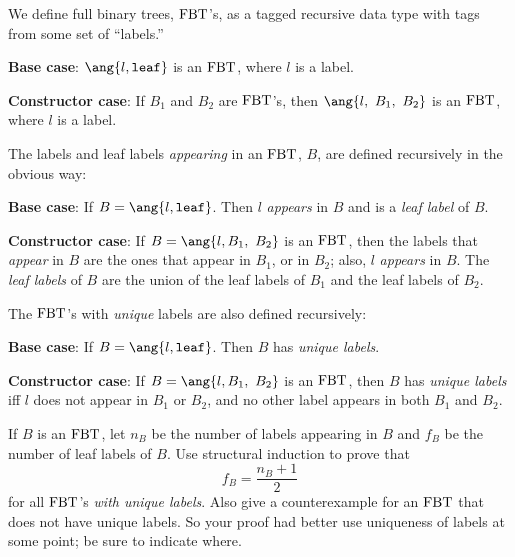 \documentclass[handout]{mcs}
\begin{document}
\begin{problem}

We define full binary trees, $\text{FBT}$'s, as a tagged recursive
data type with tags from some set of ``labels.''
\begin{definition*}

\textbf{Base case}: $\ang{l, \texttt{leaf}}$ is an $\text{FBT}$, where $l$ is a
label.

\textbf{Constructor case}: If $B_1$ and $B_2$ are $\text{FBT}$'s, then
$\ang{l,\ B_1,\ B_2}$ is an $\text{FBT}$, where $l$ is a label.

\end{definition*}

The labels and leaf labels \emph{appearing} in an $\text{FBT}$, $B$, are defined
recursively in the obvious way:

\begin{definition*}

\textbf{Base case}: If $B = \ang{l, \texttt{leaf}}$.  Then $l$
\emph{appears} in $B$ and is a \emph{leaf label} of $B$.

\textbf{Constructor case}: If $B=\ang{l, B_1,\ B_2}$ is an $\text{FBT}$, then
the labels that \emph{appear} in $B$ are the ones that appear in $B_1$, or
in $B_2$; also, $l$ \emph{appears} in $B$.  The \emph{leaf labels} of $B$
are the union of the leaf labels of $B_1$ and the leaf labels of $B_2$.

\end{definition*}

The $\text{FBT}$'s with \emph{unique} labels are also defined recursively:
\begin{definition*}

\textbf{Base case}: If $B = \ang{l,\texttt{leaf}}$.  Then $B$ has
\emph{unique labels}.

\textbf{Constructor case}: If $B=\ang{l, B_1,\ B_2}$ is an $\text{FBT}$, then
$B$ has \emph{unique labels} iff $l$ does not appear in $B_1$ or $B_2$,
and no other label appears in both $B_1$ and $B_2$.

\end{definition*}

If $B$ is an $\text{FBT}$, let $n_B$ be the number of labels appearing in $B$
and $f_B$ be the number of leaf labels of $B$.  Use structural induction
to prove that
\begin{equation}\label{lv}
f_B = \frac{{n_B}+1}{2}
\end{equation}
for all $\text{FBT}$'s \emph{with unique labels}.  Also give a counterexample
for an $\text{FBT}$ that does not have unique labels.  So your proof had better
use uniqueness of labels at some point; be sure to indicate where.


\end{problem}
\end{document}
